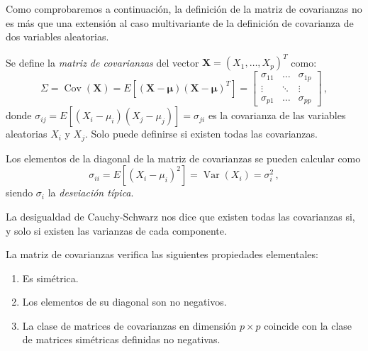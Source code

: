 Como comprobaremos a continuación, la definición de la matriz de covarianzas no es más que una extensión al caso multivariante de la definición de covarianza de dos variables aleatorias.

\begin{ndef}
  Se define la \emph{matriz de covarianzas} del vector $\boldsymbol X = (X_1,\dots,X_p)^T$ como:
  \[
\Sigma = \operatorname{Cov}(\boldsymbol X) = E\left[(\boldsymbol X-\boldsymbol \mu)(\boldsymbol X-\boldsymbol \mu)^T\right] = \begin{bmatrix} \sigma_{11} & \dots & \sigma_{1p} \\ \vdots& \ddots & \vdots \\ \sigma_{p1} &  \dots & \sigma_{pp}\end{bmatrix}\,,
\]
donde $\sigma_{ij} = E\left[(X_i - \mu_i)(X_j - \mu_j)\right] = \sigma_{ji}$ es la covarianza de las variables aleatorias $X_i$ y $X_j$. Solo puede definirse si existen todas las covarianzas. 
\end{ndef}

\begin{nota}
  Los elementos de la diagonal de la matriz de covarianzas se pueden calcular como \[\sigma_{ii}=E\left[(X_i - \mu_i)^2\right] = \operatorname{Var}(X_i) = \sigma_i^2\,,\]siendo $\sigma_i$ la \emph{desviación típica}.
\end{nota}

\begin{nota}
  La desigualdad de Cauchy-Schwarz nos dice que existen todas las covarianzas si, y solo si existen las varianzas de cada componente.
\end{nota}

\begin{nprop}
  La matriz de covarianzas verifica las siguientes propiedades elementales:
  \begin{enumerate}
    \item Es simétrica.
    \item Los elementos de su diagonal son no negativos.
    \item La clase de matrices de covarianzas en dimensión $p\times p$ coincide con la clase de matrices simétricas definidas no negativas.
    \end{enumerate}
  \end{nprop}

